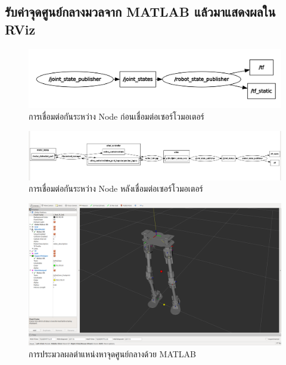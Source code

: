 \clearpage
\subsection{รับค่าจุดศูนย์กลางมวลจาก MATLAB แล้วมาแสดงผลใน RViz}

\begin{figure}[!ht]
	\centering
	\includegraphics[width=\textwidth]{chapter4/images/com_uthai_node0.png}
	\caption{การเชื่อมต่อกันระหว่าง Node ก่อนเชื่อมต่อเซอร์โวมอเตอร์}
\end{figure}
\begin{figure}[!ht]
	\centering
	\includegraphics[width=\textwidth]{chapter4/images/com_uthai_node.png}
	\caption{การเชื่อมต่อกันระหว่าง Node หลังเชื่อมต่อเซอร์โวมอเตอร์}
\end{figure}
\begin{figure}[!ht]
	\centering
	\includegraphics[width=\textwidth]{chapter4/images/com_uthai.png}
	\caption{การประมวลผลตำแหน่งหาจุดศูนย์กลางด้วย MATLAB}
\end{figure}
